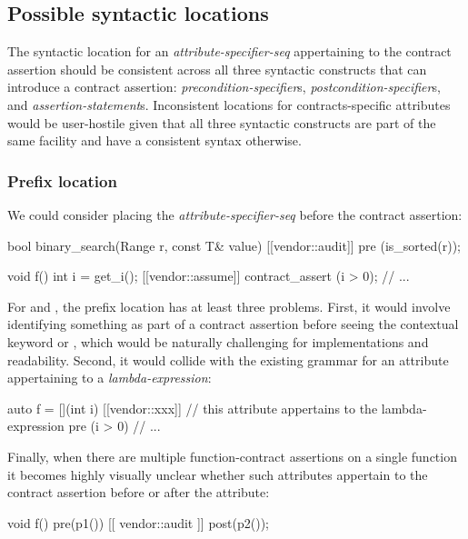 \subsection{Possible syntactic locations}

The syntactic location for an \emph{attribute-specifier-seq} appertaining to the contract assertion should be consistent across all three syntactic constructs that can introduce a contract assertion: \emph{precondition-specifier}s, \emph{postcondition-specifier}s, and \emph{assertion-statement}s. Inconsistent locations for contracts-specific attributes would be user-hostile given that all three syntactic constructs are part of the same facility and have a consistent syntax otherwise.

\subsubsection{Prefix location}

We could consider placing the \emph{attribute-specifier-seq} before the contract assertion:

\pagebreak %

\begin{codeblock}
bool binary_search(Range r, const T& value)
  [[vendor::audit]] pre (is_sorted(r));  
  
void f() {
  int i = get_i();
  [[vendor::assume]] contract_assert (i > 0);
  // ...
}
\end{codeblock}

For  and , the prefix location has at least three problems. First, it would involve identifying something as part of a
contract assertion before seeing the contextual keyword  or , which would be naturally challenging for implementations and
readability. Second, it would collide with the existing grammar for an attribute appertaining to a \emph{lambda-expression}:

\begin{codeblock}
auto f = [](int i) [[vendor::xxx]]  // this attribute appertains to the lambda-expression
  pre (i > 0) {
  // ...
}
\end{codeblock}

Finally, when there are multiple function-contract assertions on a single function it becomes highly visually unclear whether such attributes appertain to the contract assertion before or after the attribute:
\begin{codeblock}
void f() pre(p1()) [[ vendor::audit ]] post(p2()); 
\end{codeblock}

